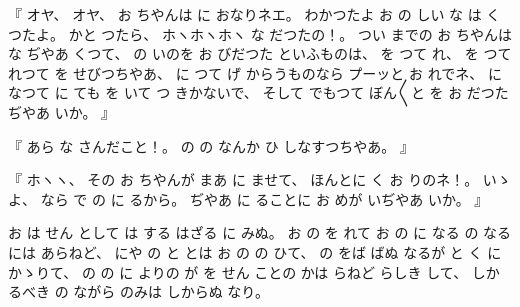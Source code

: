 %
『
オヤ、
%
オヤ、
%
お
ちやんは
に
おなりネエ。
%
わかつたよ
お
の
しい
な
は
く
つたよ。
%
かと
つたら、
%
ホヽホヽホヽ
な
だつたの！。
%
つい
までの
お
ちやんは
な
ぢやあ
くつて、
%
の
いのを
お
びだつた
といふものは、
を
つて
れ、
%
を
つて
れつて
を
せびつちやあ、
%
に
つて
げ
からうものなら
プーッと
お
れでネ、
%
に
なつて
に
ても
を
いて
つ
きかないで、
%
そして
でもつて
ぼん〳〵と
を
お
だつたぢやあ
いか。
』

%
『
あら
な
さんだこと！。
%
の
の
なんか
ひ
しなすつちやあ。
』

%
『
ホヽヽ、
%
その
お
ちやんが
まあ
に
ませて、
%
ほんとに
く
お
りのネ！。
%
いゝよ、
%
なら
で
の
に
るから。
%
ぢやあ
に
ることに
お
めが
いぢやあ
いか。
』

%
お
は
せん
として
は
する
はざる
に
みぬ。
%
お
の
を
れて
お
の
に
なる
の
なる
には
あらねど、
%
にや
の
と
とは
お
の
の
ひて、
%
の
をば
ばぬ
なるが
と
く
に
かゝりて、
%
の
の
に
よりの
が
を
せん
ことの
かは
らねど
らしき
して、
%
しかるべき
の
ながら
のみは
しからぬ
なり。

